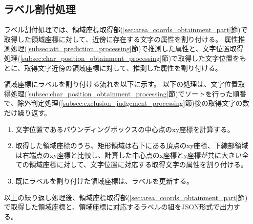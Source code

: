\subsection{ラベル割付処理}\label{subsec:label_link_processing}
ラベル割付処理では、領域座標取得部(\ref{sec:area_coords_obtainment_part}節)で取得した領域座標に対して、近傍に存在する文字の属性を割り付ける。
属性推測処理(\ref{subsec:att_prediction_processing}節)で推測した属性と、文字位置取得処理(\ref{subsec:char_position_obtainment_processing}節)で取得した文字位置をもとに、取得文字近傍の領域座標に対して、推測した属性を割り付ける。

領域座標にラベルを割り付ける流れを以下に示す。
以下の処理は、文字位置取得処理(\ref{subsec:char_position_obtainment_processing}節)でソートを行った順番で、除外判定処理(\ref{subsec:exclusion_judgement_processing}節)後の取得文字の数だけ繰り返す。

\begin{enumerate}
    \item 文字位置であるバウンディングボックスの中心点のxy座標を計算する。
    \item 取得した領域座標のうち、矩形領域は右下にある頂点のxy座標、下線部領域は右端点のxy座標と比較し、計算した中心点のx座標とy座標が共に大きい全ての領域座標に対して、文字位置に対応する取得文字の属性を割り付ける。
    \item 既にラベルを割り付けた領域座標は、ラベルを更新する。
\end{enumerate}

以上の繰り返し処理後、領域座標取得部(\ref{sec:area_coords_obtainment_part}節)で取得した領域座標と、領域座標に対応するラベルの組をJSON形式で出力する。
